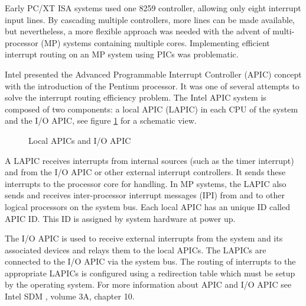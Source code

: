 Early PC/XT ISA systems used one 8259 controller, allowing only eight
interrupt input lines. By cascading multiple controllers, more lines can be made
available, but nevertheless, a more flexible approach was needed with the advent
of multi-processor (MP) systems containing multiple cores.
Implementing efficient interrupt routing on an MP system using PICs was
problematic.

Intel presented the Advanced Programmable Interrupt Controller
(APIC) concept with the introduction of the Pentium processor. It
was one of several attempts to solve the interrupt routing efficiency problem.
The Intel APIC system is composed of two components: a local APIC
(LAPIC) in each CPU of the system and the I/O APIC,
see figure \ref{fig:apic} for a schematic view.

\begin{figure}[h]
	\centering
	
	\caption{Local APICs and I/O APIC}
	\label{fig:apic}
\end{figure}

A LAPIC receives interrupts from internal sources (such as the timer interrupt)
and from the I/O APIC or other external interrupt controllers. It sends these
interrupts to the processor core for handling. In MP systems, the LAPIC also
sends and receives inter-processor interrupt messages (IPI) from and
to other logical processors on the system bus. Each local APIC has an unique ID
called APIC ID. This ID is assigned by system hardware at power
up.

The I/O APIC is used to receive external interrupts from the system and its
associated devices and relays them to the local APICs. The LAPICs are connected
to the I/O APIC via the system bus. The routing of interrupts to the appropriate
LAPICs is configured using a redirection table which must be setup by the
operating system. For more information about APIC and I/O APIC see Intel SDM
\cite{IntelSDM}, volume 3A, chapter 10.
